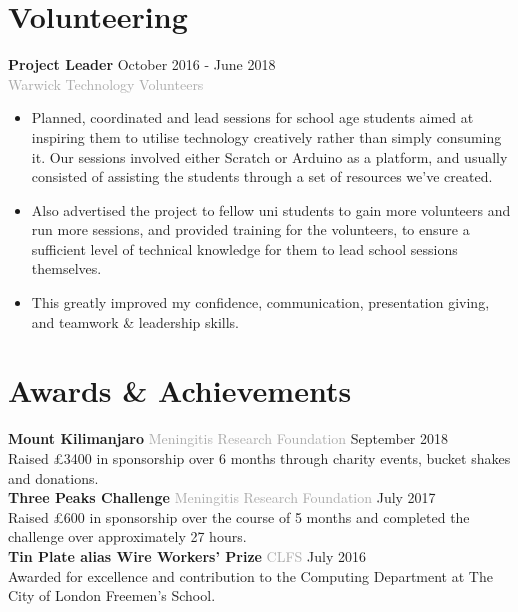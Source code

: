 \documentclass[11pt]{article}
\newcommand{\dash}{\item[-]}
\newcommand{\linesep}{\noindent\makebox[\linewidth]{\rule{\linewidth}{0.2pt}}}
\begin{document}
  \linesep

  \section*{Volunteering}
\textbf{Project Leader} \hfill October 2016 - June 2018 \\
\textcolor{darkgray}{Warwick Technology Volunteers}
   \begin{itemize}
    \dash Planned, coordinated and lead sessions for school age students aimed at inspiring them to utilise technology creatively rather than simply consuming it. Our sessions involved either Scratch or Arduino as a platform, and usually consisted of assisting the students through a set of resources we’ve created.
	\dash Also advertised the project to fellow uni students to gain more volunteers and run more sessions, and provided training for the volunteers, to ensure a sufficient level of technical knowledge for them to lead school sessions themselves.
	\dash This greatly improved my confidence, communication, presentation giving, and teamwork \& leadership skills.
   \end{itemize}

  \linesep

  \section*{Awards \& Achievements}
\textbf{Mount Kilimanjaro} \hfill \hspace{4em} \textcolor{darkgray}{Meningitis Research Foundation} \hfill September 2018 \\
\hspace*{2em} Raised £3400 in sponsorship over 6 months through charity events, bucket shakes and  donations.
\vspace{1ex}\\
\textbf{Three Peaks Challenge} \hfill \textcolor{darkgray}{Meningitis Research Foundation} \hfill July 2017 \\
\hspace*{2em} Raised £600 in sponsorship over the course of 5 months and completed the challenge over approximately 27 hours.
\vspace{1ex}\\
\textbf{Tin Plate alias Wire Workers’ Prize} \hfill \hspace{-17em} \textcolor{darkgray}{CLFS} \hfill July 2016 \\
\hspace*{2em} Awarded for excellence and contribution to the Computing Department at The City of London Freemen’s School.
\end{document}
